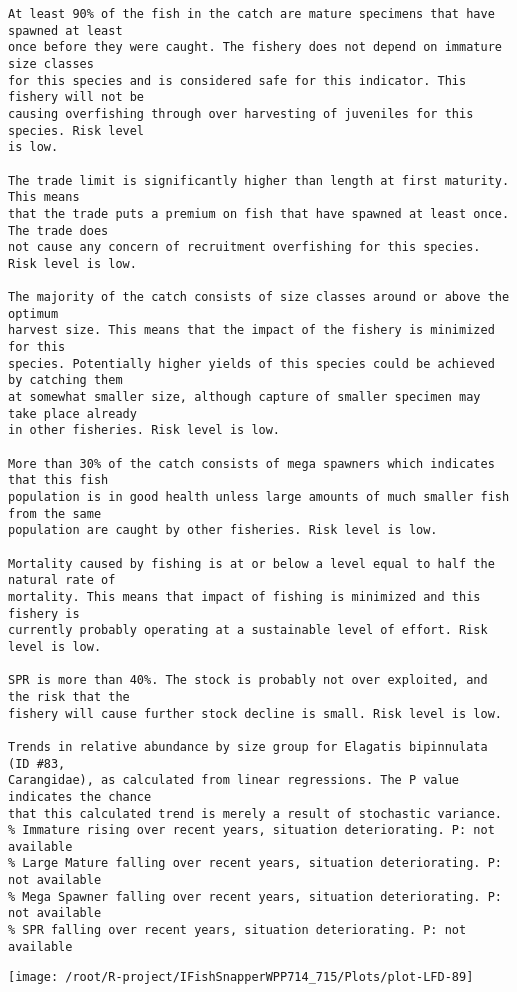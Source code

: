 \documentclass{report}\usepackage[]{graphicx}\usepackage[]{color}
\makeatletter
\def\maxwidth{ %
  \ifdim\Gin@nat@width>\linewidth
    \linewidth
  \else
    \Gin@nat@width
  \fi
}
\newenvironment{kframe}{%
 \def\at@end@of@kframe{}%
 \ifinner\ifhmode%
  \def\at@end@of@kframe{\end{minipage}}%
  \begin{minipage}{\columnwidth}%
 \fi\fi%
 \def\FrameCommand##1{\hskip\@totalleftmargin \hskip-\fboxsep
 \colorbox{shadecolor}{##1}\hskip-\fboxsep
     \hskip-\linewidth \hskip-\@totalleftmargin \hskip\columnwidth}%
 \MakeFramed {\advance\hsize-\width
   \@totalleftmargin\z@ \linewidth\hsize
   \@setminipage}}%
 {\par\unskip\endMakeFramed%
 \at@end@of@kframe}
\newenvironment{knitrout}{}{} %
\makeatother
\begin{document}
\begin{knitrout}
\begin{kframe}
\begin{verbatim}
At least 90% of the fish in the catch are mature specimens that have spawned at least
once before they were caught. The fishery does not depend on immature size classes
for this species and is considered safe for this indicator. This fishery will not be
causing overfishing through over harvesting of juveniles for this species. Risk level
is low.

The trade limit is significantly higher than length at first maturity.  This means
that the trade puts a premium on fish that have spawned at least once. The trade does
not cause any concern of recruitment overfishing for this species. Risk level is low.

The majority of the catch consists of size classes around or above the optimum
harvest size. This means that the impact of the fishery is minimized for this
species. Potentially higher yields of this species could be achieved by catching them
at somewhat smaller size, although capture of smaller specimen may take place already
in other fisheries. Risk level is low.

More than 30% of the catch consists of mega spawners which indicates that this fish
population is in good health unless large amounts of much smaller fish from the same
population are caught by other fisheries. Risk level is low.
 
Mortality caused by fishing is at or below a level equal to half the natural rate of
mortality. This means that impact of fishing is minimized and this fishery is
currently probably operating at a sustainable level of effort. Risk level is low.
 
SPR is more than 40%. The stock is probably not over exploited, and the risk that the
fishery will cause further stock decline is small. Risk level is low.
 
Trends in relative abundance by size group for Elagatis bipinnulata (ID #83,
Carangidae), as calculated from linear regressions. The P value indicates the chance
that this calculated trend is merely a result of stochastic variance.
% Immature rising over recent years, situation deteriorating. P: not available
% Large Mature falling over recent years, situation deteriorating. P: not available
% Mega Spawner falling over recent years, situation deteriorating. P: not available
% SPR falling over recent years, situation deteriorating. P: not available
\end{verbatim}
\end{kframe}
\texttt{[image: /root/R-project/IFishSnapperWPP714\_715/Plots/plot-LFD-89]} 


\end{knitrout}
\end{document}
